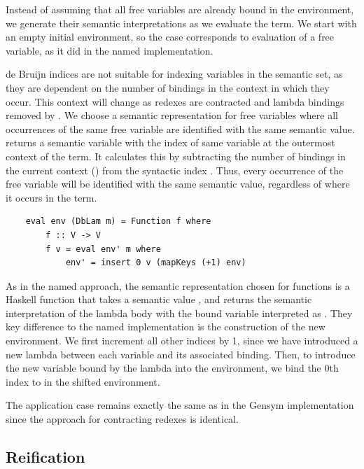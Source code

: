 Instead of assuming that all free variables are already bound in the environment, we generate their semantic interpretations as we evaluate the term. We start with an empty initial environment, so the  case corresponds to evaluation of a free variable, as it did in the named implementation. 


de Bruijn indices are not suitable for indexing variables in the semantic set, as they are dependent on the number of bindings in the context in which they occur. This context will change as redexes are contracted and lambda bindings removed by . We choose a semantic representation for free variables where all occurrences of the same free variable are identified with the same semantic value.
 returns a semantic variable with the index of same variable at the outermost context of the term. It calculates this by subtracting the number of bindings in the current context () from the syntactic index . Thus, every occurrence of the free variable will be identified with the same semantic value, regardless of where it occurs in the term. 

\begin{lstlisting}
    eval env (DbLam m) = Function f where
        f :: V -> V
        f v = eval env' m where
            env' = insert 0 v (mapKeys (+1) env)
\end{lstlisting}

As in the named approach, the semantic representation chosen for functions is a Haskell function that takes a semantic value , and returns the semantic interpretation of the lambda body with the bound variable interpreted as . They key difference to the named implementation is the construction of the new environment. We first increment all other indices by 1, since we have introduced a new lambda between each variable and its associated binding. Then, to introduce the new variable bound by the lambda into the environment, we bind the 0th index to  in the shifted environment.

The application case remains exactly the same as in the Gensym implementation since the approach for contracting redexes is identical.

\vspace{\baselineskip}

\subsection{Reification}

